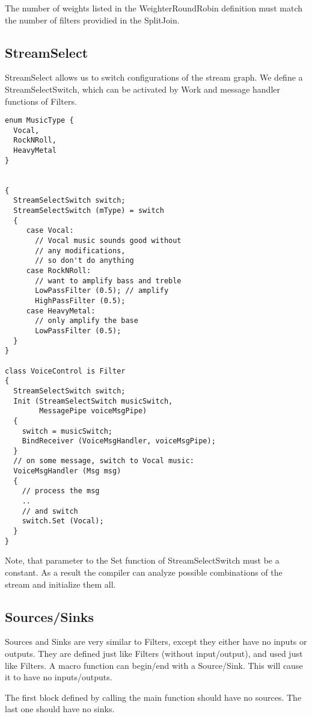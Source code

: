 \documentclass[twocolumn, draft]{article}
\begin{document}
The number of weights listed in the WeighterRoundRobin definition must
match the number of filters providied in the SplitJoin.

\subsection{StreamSelect}

StreamSelect allows us to switch configurations of the stream graph.
We define a StreamSelectSwitch, which can be activated by Work and message
handler functions of Filters. 

\begin{verbatim}
enum MusicType {
  Vocal,
  RockNRoll,
  HeavyMetal
}


{
  StreamSelectSwitch switch;
  StreamSelectSwitch (mType) = switch
  {
     case Vocal:
       // Vocal music sounds good without 
       // any modifications,
       // so don't do anything
     case RockNRoll:
       // want to amplify bass and treble
       LowPassFilter (0.5); // amplify
       HighPassFilter (0.5);
     case HeavyMetal:
       // only amplify the base
       LowPassFilter (0.5);
  }
}

class VoiceControl is Filter
{
  StreamSelectSwitch switch;
  Init (StreamSelectSwitch musicSwitch, 
        MessagePipe voiceMsgPipe)
  {
    switch = musicSwitch;
    BindReceiver (VoiceMsgHandler, voiceMsgPipe);
  }
  // on some message, switch to Vocal music:
  VoiceMsgHandler (Msg msg)
  {
    // process the msg
    ..
    // and switch
    switch.Set (Vocal);
  }
}
\end{verbatim}

Note, that parameter to the Set function of StreamSelectSwitch must be
a constant.  As a result the compiler can analyze possible combinations
of the stream and initialize them all.

\subsection{Sources/Sinks}

Sources and Sinks are very similar to Filters, except they either have
no inputs or outputs.  They are defined just like Filters (without
input/output), and used just like Filters.  A macro function can begin/end
with a Source/Sink.  This will cause it to have
no inputs/outputs.

The first block defined by calling the main function should have
no sources.  The last one should have no sinks.
\end{document}
